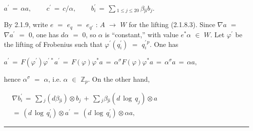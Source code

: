 \documentclass[9pt]{article}
\newcommand{\CanonText}[1]{\par{\fontsize{8.0}{9.35}\selectfont\RaggedRight #1\par}\vspace{2.2pt}}
\newcommand{\CanonDisplay}[1]{\par\vspace{1.2pt}\begin{center}{\fontsize{7.2}{8.4}\selectfont\(\displaystyle #1\)}\end{center}\vspace{1.2pt}}
\newenvironment{CanonMathBlock}{\par\vspace{1.2pt}\begin{center}\fontsize{6.8}{8.0}\selectfont\(\displaystyle}{\)\end{center}\vspace{1.2pt}}
\begin{document}
\begin{minipage}[t][\dimexpr\textheight-5pt\relax][t]{\textwidth}
\CanonDisplay{a^{\prime}\,=\,\alpha{}a,\qquad\,c^{\prime}\,=\,c/\alpha{},\qquad\,b^{\prime}_{i}\,=\,\sum{}_{1\leq{}j\leq{}20}\,\beta{}_{\mathrm{ji}}b_{j}.}
\CanonText{By 2.1.9, write \(e\) \(=\) \(e_{q}\) \(=\) \(e_{q'}\) : \(A\) \(\to{}\) \(W\) for the lifting (2.1.8.3). Since \(\nabla{}a\) \(=\) \(\nabla{}a^{\prime}\) \(=\) 0, one has \(d\alpha{}\) \(=\) 0, so \(\alpha{}\) is “constant,” with value \(e^{*}\alpha{}\) \(\in{}\) \(W\). Let \(\varphi{}^{\prime}\) be the lifting of Frobenius such that \(\varphi{}^{\prime}(q^{\prime}_{i})\) \(=\) \(q_{i}^{\prime\,p}\). One has}
\CanonDisplay{a^{\prime}\,=\,F(\varphi{}^{\prime})\varphi{}^{\prime\,*}a^{\prime}\,=\,F(\varphi{})\varphi{}^{*}a\,=\,\alpha{}^\sigma{}F(\varphi{})\varphi{}^{*}a\,=\,\alpha{}^\sigma{}a\,=\,\alpha{}a,}
\CanonText{hence \(\alpha{}^\sigma{}\) \(=\) \(\alpha{}\), i.e. \(\alpha{}\) \(\in{}\) \(\mathbb{Z}_{p}\). On the other hand,}
\begin{CanonMathBlock}
\begin{aligned}
& \nabla{}b^{\prime}_{i}\,=\,\sum{}_{j}(d\beta{}_{\mathrm{ji}})\otimes{}b_{j}\,+\,\sum{}_{j}\beta{}_{\mathrm{ji}}(d\,\operatorname{log}\,q_{j})\otimes{}a\\
& =\,(d\,\operatorname{log}\,q^{\prime}_{i})\otimes{}a^{\prime}\,=\,(d\,\operatorname{log}\,q^{\prime}_{i})\otimes{}\alpha{}a,
\end{aligned}
\end{CanonMathBlock}
\vfill
{\color{Accent}\hrule height 0.35pt}\vspace{3pt}
\end{minipage}
\newpage
\end{document}
